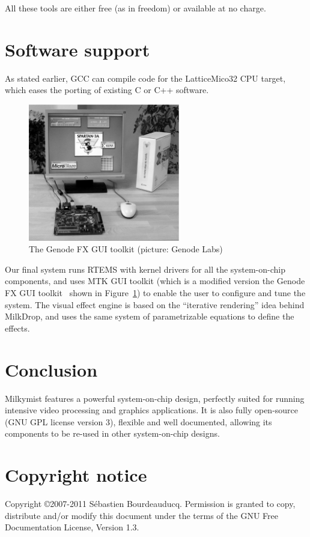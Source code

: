 \documentclass[a4paper,11pt,twocolumn]{paper}
\begin{document}
All these tools are either free (as in freedom) or available at no charge.

\section{Software support}
As stated earlier, GCC can compile code for the LatticeMico32 CPU target, which eases the porting of existing C or C++ software.

\begin{figure}
\centering
\includegraphics[height=60mm]{genode_bw.eps}
\caption{The Genode FX GUI toolkit (picture: Genode Labs)}
\label{fig:genodefx}
\end{figure}

Our final system runs RTEMS with kernel drivers for all the system-on-chip components, and uses MTK GUI toolkit (which is a modified version the Genode FX GUI toolkit~\cite{genodefx} shown in Figure~\ref{fig:genodefx}) to enable the user to configure and tune the system. The visual effect engine is based on the ``iterative rendering'' idea behind MilkDrop, and uses the same system of parametrizable equations to define the effects.

\section{Conclusion}
Milkymist features a powerful system-on-chip design, perfectly suited for running intensive video processing and graphics applications. It is also fully open-source (GNU GPL license version 3), flexible and well documented, allowing its components to be re-used in other system-on-chip designs.

\section*{Copyright notice}
Copyright \copyright 2007-2011 S\'ebastien Bourdeauducq. Permission is granted to copy, distribute and/or modify this document under the terms of the GNU Free Documentation License, Version 1.3.

{}

\end{document}
